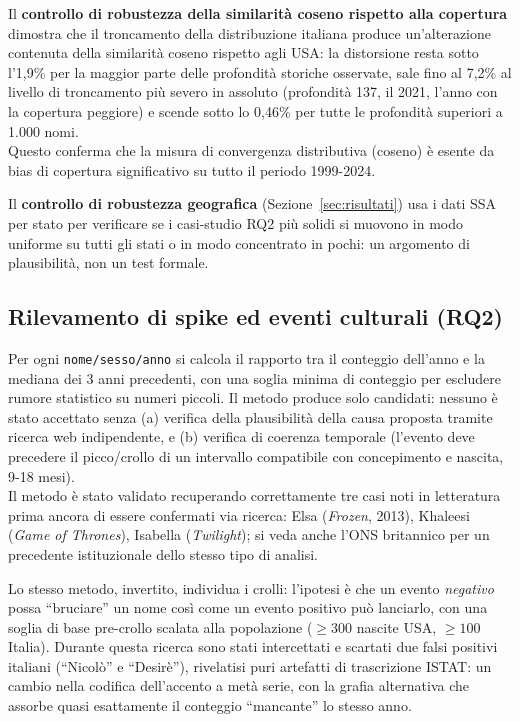 \documentclass[conference]{IEEEtran}
\begin{document}
Il \textbf{controllo di robustezza della similarità coseno rispetto alla copertura}
dimostra che il troncamento della distribuzione italiana produce un'alterazione contenuta della
similarità coseno rispetto agli USA: la distorsione resta sotto l'1,9\% per la maggior parte delle
profondità storiche osservate, sale fino al 7,2\% al livello di troncamento più severo in assoluto
(profondità 137, il 2021, l'anno con la copertura peggiore) e scende sotto lo 0,46\% per tutte
le profondità superiori a 1.000 nomi. \\
Questo conferma che la misura di convergenza distributiva (coseno) è esente da bias di copertura
significativo su tutto il periodo 1999-2024.

Il \textbf{controllo di robustezza geografica} (Sezione~\ref{sec:risultati}) usa i dati SSA per stato
per verificare se i casi-studio RQ2 più solidi si muovono in modo uniforme su tutti gli stati o in
modo concentrato in pochi: un argomento di plausibilità, non un test formale.

\subsection{Rilevamento di spike ed eventi culturali (RQ2)}

Per ogni \texttt{nome/sesso/anno} si calcola il rapporto tra il conteggio dell'anno e la mediana dei 3 anni
precedenti, con una soglia minima di conteggio per escludere rumore statistico su numeri piccoli. Il
metodo produce solo candidati: nessuno è stato accettato senza (a) verifica della plausibilità della
causa proposta tramite ricerca web indipendente, e (b) verifica di coerenza temporale (l'evento deve
precedere il picco/crollo di un intervallo compatibile con concepimento e nascita, 9-18 mesi). \\
Il metodo è stato validato recuperando correttamente tre casi noti in letteratura prima ancora di essere
confermati via ricerca: Elsa (\emph{Frozen}, 2013), Khaleesi (\emph{Game of Thrones}), Isabella
(\emph{Twilight}); si veda anche l'ONS britannico \cite{ons2015} per un precedente istituzionale dello
stesso tipo di analisi.

Lo stesso metodo, invertito, individua i crolli: l'ipotesi è che un evento \emph{negativo} possa
``bruciare'' un nome così come un evento positivo può lanciarlo, con una soglia di base pre-crollo
scalata alla popolazione (${\geq}300$ nascite USA, ${\geq}100$ Italia). Durante questa ricerca sono
stati intercettati e scartati due falsi positivi italiani (``Nicolò'' e ``Desirè''), rivelatisi puri
artefatti di trascrizione ISTAT: un cambio nella codifica dell'accento a metà serie, con la grafia
alternativa che assorbe quasi esattamente il conteggio ``mancante'' lo stesso anno.
\end{document}
